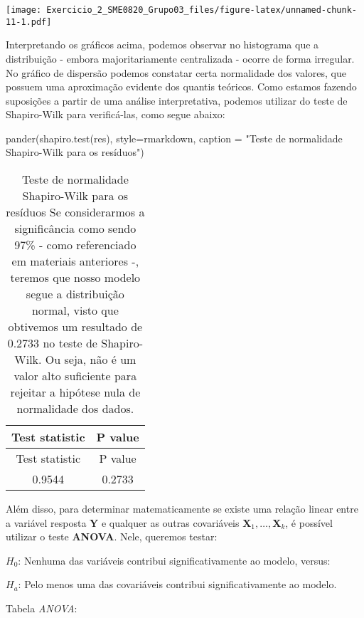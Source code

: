 \documentclass[
]{article}
\newenvironment{Shaded}{\begin{snugshade}}{\end{snugshade}}
\newcommand{\AttributeTok}[1]{\textcolor[rgb]{0.77,0.63,0.00}{#1}}
\newcommand{\FunctionTok}[1]{\textcolor[rgb]{0.00,0.00,0.00}{#1}}
\newcommand{\NormalTok}[1]{#1}
\newcommand{\StringTok}[1]{\textcolor[rgb]{0.31,0.60,0.02}{#1}}
\begin{document}
\texttt{[image: Exercicio\_2\_SME0820\_Grupo03\_files/figure-latex/unnamed-chunk-11-1.pdf]}

Interpretando os gráficos acima, podemos observar no histograma que a
distribuição - embora majoritariamente centralizada - ocorre de forma
irregular. No gráfico de dispersão podemos constatar certa normalidade
dos valores, que possuem uma aproximação evidente dos quantis teóricos.
Como estamos fazendo suposições a partir de uma análise interpretativa,
podemos utilizar do teste de Shapiro-Wilk para verificá-las, como segue
abaixo:

\begin{Shaded}
\begin{Highlighting}[]
\FunctionTok{pander}\NormalTok{(}\FunctionTok{shapiro.test}\NormalTok{(res), }\AttributeTok{style=}\StringTok{\textquotesingle{}rmarkdown\textquotesingle{}}\NormalTok{,}
       \AttributeTok{caption =} \StringTok{"Teste de normalidade Shapiro{-}Wilk para os resíduos"}\NormalTok{)}
\end{Highlighting}
\end{Shaded}

\begin{longtable}[]{@{}cc@{}}
\caption{Teste de normalidade Shapiro-Wilk para os resíduos Se
considerarmos a significância como sendo 97\% - como referenciado em
materiais anteriores -, teremos que nosso modelo segue a distribuição
normal, visto que obtivemos um resultado de 0.2733 no teste de
Shapiro-Wilk. Ou seja, não é um valor alto suficiente para rejeitar a
hipótese nula de normalidade dos dados.}\tabularnewline
\toprule
Test statistic & P value \\
\midrule
\endfirsthead
\toprule
Test statistic & P value \\
\midrule
\endhead
0.9544 & 0.2733 \\
\bottomrule
\end{longtable}

Além disso, para determinar matematicamente se existe uma relação linear
entre a variável resposta \(\boldsymbol{Y}\) e qualquer as outras
covariáveis \(\boldsymbol{X}_1,\ldots,\boldsymbol{X}_k\), é possível
utilizar o teste \textbf{ANOVA}. Nele, queremos testar:

\textbf{\(H_0\)}: Nenhuma das variáveis contribui significativamente ao
modelo, versus:

\textbf{\(H_a\)}: Pelo menos uma das covariáveis contribui
significativamente ao modelo.

Tabela \emph{ANOVA}:
\end{document}
